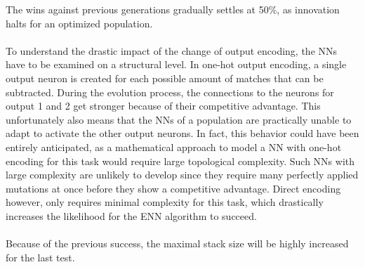 The wins against previous generations gradually settles at 50\%, as innovation halts for an optimized population.
\\ \\
To understand the drastic impact of the change of output encoding, the NNs have to be examined on a structural level.
In one-hot output encoding, a single output neuron is created for each possible amount of matches that can be subtracted.
During the evolution process, the connections to the neurons for output 1 and 2 get stronger because of their competitive advantage.
This unfortunately also means that the NNs of a population are practically unable to adapt to activate the other output neurons.
In fact, this behavior could have been entirely anticipated, as a mathematical approach to model a NN with one-hot encoding for this task would require large topological complexity.
Such NNs with large complexity are unlikely to develop since they require many perfectly applied mutations at once before they show a competitive advantage.
Direct encoding however, only requires minimal complexity for this task, which drastically increases the likelihood for the ENN algorithm to succeed.
\\\\
Because of the previous success, the maximal stack size will be highly increased for the last test.


